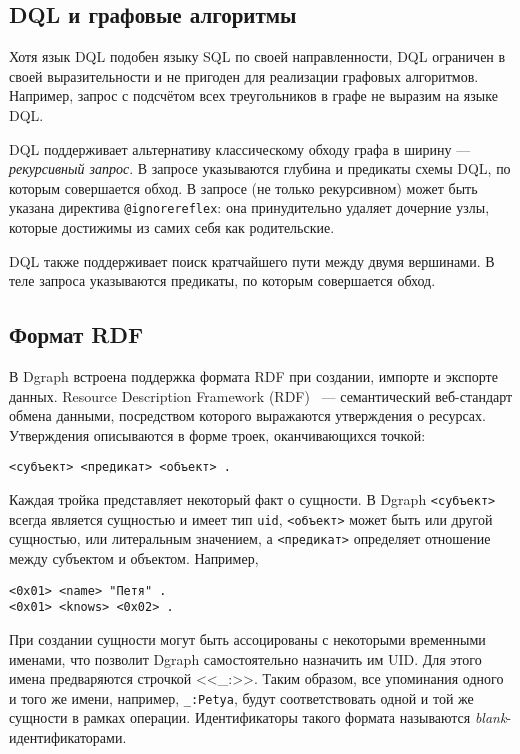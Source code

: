 \subsection{DQL и графовые алгоритмы}

Хотя язык DQL подобен языку SQL по своей направленности, DQL ограничен в своей выразительности и не пригоден для
реализации графовых алгоритмов. Например, запрос с подсчётом всех треугольников в графе не выразим на языке DQL.

DQL поддерживает альтернативу классическому обходу графа в ширину --- \textit{рекурсивный запрос}. В запросе указываются
глубина и предикаты схемы DQL, по которым совершается обход. В запросе (не только рекурсивном) может быть указана
директива \texttt{@ignorereflex}: она принудительно удаляет дочерние узлы, которые достижимы из самих себя как
родительские.

DQL также поддерживает поиск кратчайшего пути между двумя вершинами. В теле запроса указываются предикаты, по которым
совершается обход.

\subsection{Формат RDF}

В Dgraph встроена поддержка формата RDF при создании, импорте и экспорте данных. Resource Description Framework
(RDF)~\cite{rdf} --- семантический веб-стандарт обмена данными, посредством которого выражаются утверждения о ресурсах.
Утверждения описываются в форме троек, оканчивающихся точкой:
\begin{Verbatim}
<субъект> <предикат> <объект> .
\end{Verbatim}

Каждая тройка представляет некоторый факт о сущности. В Dgraph \texttt{<субъект>} всегда является сущностью и имеет тип
\texttt{uid}, \texttt{<объект>} может быть или другой сущностью, или литеральным значением, а \texttt{<предикат>}
определяет отношение между субъектом и объектом. Например,
\begin{Verbatim}
<0x01> <name> "Петя" .
<0x01> <knows> <0x02> .
\end{Verbatim}

При создании сущности могут быть ассоцированы с некоторыми временными именами, что позволит Dgraph самостоятельно
назначить им UID. Для этого имена предваряются строчкой <<\_:>>. Таким образом, все упоминания одного и того же имени,
например, \texttt{\_:Petya}, будут соответствовать одной и той же сущности в рамках операции. Идентификаторы такого
формата называются \textit{blank}-идентификаторами.

